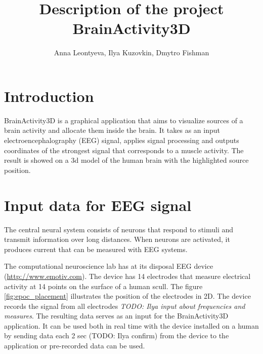 \documentclass[]{report}   %
\begin{document}
\title{Description of the project BrainActivity3D}   %
\author{Anna Leontyeva, Ilya Kuzovkin, Dmytro Fishman}         %

\maketitle
     
\section{Introduction}
BrainActivity3D is a graphical application that aims to visualize sources of a brain activity and allocate them inside the brain. It takes as an input electroencephalography (EEG) signal, applies signal processing and outputs coordinates of the strongest signal that corresponds to a muscle activity. The result is showed on a 3d model of the human brain with the highlighted source position.         

\section{Input data for EEG signal}
The central neural system consists of neurons that respond to stimuli and transmit information over long distances. When  neurons are activated, it produces current that can be measured with EEG systems.
 
The computational neuroscience lab has at its disposal EEG device (\url{http://www.emotiv.com}). The device has 14 electrodes that measure electrical activity at 14 points on the surface of a human scull. The figure \ref{fig:epoc_placement} illustrates the position of the electrodes in 2D. 
The device records the signal from all electrodes  \emph{TODO: Ilya input about frequencies and measures}.
The resulting data serves as an input for the BrainActivity3D application. It can be used both in real time with the device installed on a human by sending data each 2 sec (TODO: Ilya confirm) from the device to the application or pre-recorded data can be used.
  
\end{document}
